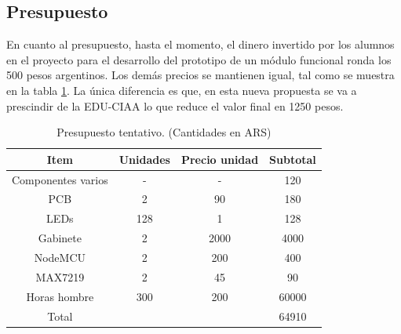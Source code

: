 \subsection{Presupuesto}
En cuanto al presupuesto, hasta el momento, el dinero invertido por los alumnos en el proyecto para el desarrollo del prototipo de un módulo funcional ronda los 500 pesos argentinos. Los demás precios se mantienen igual, tal como se muestra en la tabla \ref{tab:presupuesto}. La única diferencia es que, en esta nueva propuesta se va a prescindir de la EDU-CIAA lo que reduce el valor final en 1250 pesos.

\begin{table}[h!]
	\centering
	\caption{Presupuesto tentativo. (Cantidades en ARS)}
	\vspace{0.25cm}
	\label{tab:presupuesto}
	\begin{tabular}{cccc}
		Item				& Unidades		& Precio unidad		& Subtotal			\\
		\hline
		Componentes varios	& -				& -					& 120				\\
		PCB					& 2				& 90				& 180				\\
		LEDs				& 128			& 1					& 128				\\
		Gabinete			& 2				& 2000				& 4000				\\
		NodeMCU				& 2				& 200				& 400				\\
		MAX7219				& 2				& 45				& 90				\\
		Horas hombre		& 300			& 200				& 60000				\\
		\hline
		Total				&				&					& 64910				\\ 
		\hline
	\end{tabular}
\end{table}
